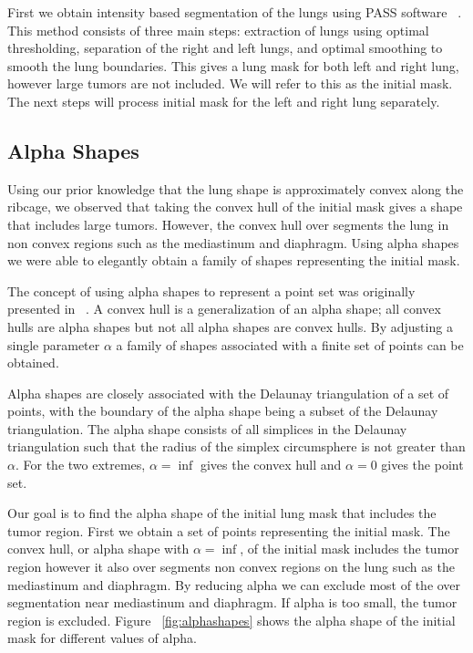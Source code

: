 \documentclass{llncs}
\begin{document}
First we obtain intensity based segmentation of the lungs using PASS software ~\cite{guo2008}. This method consists of three main steps: extraction of lungs using optimal thresholding, separation of the right and left lungs, and optimal smoothing to smooth the lung boundaries. This gives a lung mask for both left and right lung, however large tumors are not included. We will refer to this as the initial mask. The next steps will process initial mask for the left and right lung separately. 
%
\subsection{Alpha Shapes}
%
Using our prior knowledge that the lung shape is approximately convex along the ribcage, we observed that taking the convex hull of the initial mask gives a shape that includes large tumors. However, the convex hull over segments the lung in non convex regions such as the mediastinum and diaphragm. Using alpha shapes we were able to elegantly obtain a family of shapes representing the initial mask. 

The concept of using alpha shapes to represent a point set was originally presented in ~\cite{edelsbrunner1983}. A convex hull is a generalization of an alpha shape; all convex hulls are alpha shapes but not all alpha shapes are convex hulls. By adjusting a single parameter $\alpha$ a family of shapes associated with a finite set of points can be obtained.

Alpha shapes are closely associated with the Delaunay triangulation of a set of points, with the boundary of the alpha shape being a subset of the Delaunay triangulation. The alpha shape consists of all simplices in the Delaunay triangulation such that the radius of the simplex circumsphere is not greater than $ \alpha $. For the two extremes, $ \alpha=\inf $ gives the convex hull and  $ \alpha=0 $ gives the point set. 

Our goal is to find the alpha shape of the initial lung mask that includes the tumor region. First we obtain a set of points representing the initial mask. The convex hull, or alpha shape with $ \alpha = \inf $, of the initial mask includes the tumor region however it also over segments non convex regions on the lung such as the mediastinum and diaphragm. By reducing alpha we can exclude most of the over segmentation near mediastinum and diaphragm. If alpha is too small, the tumor region is excluded. Figure ~\ref{fig:alphashapes} shows the alpha shape of the initial mask for different values of alpha. 
\end{document}
